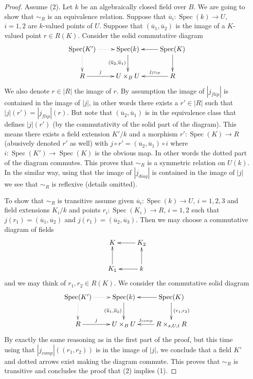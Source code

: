 \documentclass[10pt,a4paper]{amsart}
\theoremstyle{plain}
\theoremstyle{definition}
\theoremstyle{remark}
\numberwithin{equation}{subsection}
\def\Spec{\mathop{\mathrm{Spec}}}
\begin{document}
\begin{proof}
Assume (2). Let $k$ be an algebraically closed field over $B$.
We are going to show that $\sim_R$ is an equivalence relation.
Suppose that $\overline{u}_i : \Spec(k) \to U$, $i = 1, 2$
are $k$-valued points of $U$. Suppose that $(\overline{u}_1, \overline{u}_2)$
is the image of a $K$-valued point $r \in R(K)$. Consider the
solid commutative diagram
$$
\xymatrix{
\Spec(K') \ar@{..>}[r] \ar@{..>}[d]
&
\Spec(k) \ar[d]_{(\overline{u}_2, \overline{u}_1)} &
\Spec(K) \ar[d] \ar[l] \\
R \ar[r]^-j &
U \times_B U &
R \ar[l]_-{j_{flip}}
}
$$
We also denote $r \in |R|$ the image of $r$.
By assumption the image of $|j_{flip}|$ is contained in the image of
$|j|$, in other words there exists a $r' \in |R|$ such that
$|j|(r') = |j_{flip}|(r)$. But note that $(\overline{u}_2, \overline{u}_1)$
is in the equivalence class that defines $|j|(r')$ (by the commutativity
of the solid part of the diagram). This means there exists a field
extension $K'/k$ and a morphism $r' : \Spec(K) \to R$
(abusively denoted $r'$ as well) with
$j \circ r' = (\overline{u}_2, \overline{u}_1) \circ i$
where $i : \Spec(K') \to \Spec(K)$ is the obvious map.
In other words the dotted part of the diagram commutes.
This proves that $\sim_R$ is a symmetric relation on $U(k)$.
In the similar way, using that the image of $|j_{diag}|$ is contained
in the image of $|j|$ we see that $\sim_R$ is reflexive (details omitted).

\medskip\noindent
To show that $\sim_R$ is transitive assume given
$\overline{u}_i : \Spec(k) \to U$, $i = 1, 2, 3$
and field extensions $K_i/k$ and points
$r_i : \Spec(K_i) \to R$, $i = 1, 2$ such that
$j(r_1) = (\overline{u}_1, \overline{u}_2)$ and
$j(r_1) = (\overline{u}_2, \overline{u}_3)$. Then we may choose a
commutative diagram of fields
$$
\xymatrix{
K & K_2 \ar[l] \\
K_1 \ar[u] & k \ar[l] \ar[u]
}
$$
and we may think of $r_1, r_2 \in R(K)$. We consider the
commutative solid diagram
$$
\xymatrix{
\Spec(K') \ar@{..>}[r] \ar@{..>}[d]
&
\Spec(k) \ar[d]_{(\overline{u}_1, \overline{u}_3)} &
\Spec(K) \ar[d]^{(r_1, r_2)} \ar[l]
\\
R \ar[r]^-j &
U \times_B U &
R \times_{s, U, t} R \ar[l]_-{j_{comp}}
}
$$
By exactly the same reasoning as in the first part of the proof, but
this time using that $|j_{comp}|((r_1, r_2))$ is in the image of $|j|$,
we conclude that a field $K'$ and dotted arrows exist making the
diagram commute. This proves that $\sim_R$ is transitive and concludes
the proof that (2) implies (1).


\end{proof}
\end{document}

